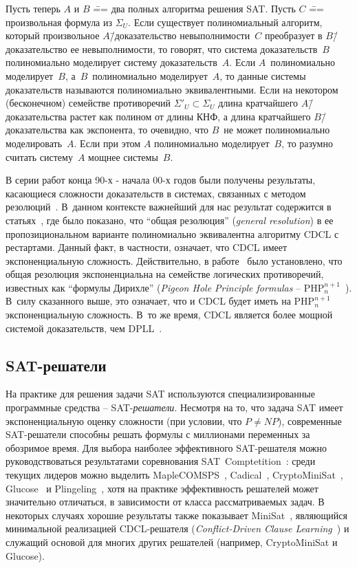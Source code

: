 Пусть теперь $A$ и $B$ \=== два полных алгоритма решения SAT.
Пусть $C$ \=== произвольная формула из $\Sigma_{U}$.
Если существует полиномиальный алгоритм, который произвольное $A$\=/доказательство невыполнимости~$C$ преобразует в $B$\=/доказательство ее невыполнимости, то говорят, что система доказательств~$B$ полиномиально моделирует систему доказательств~$A$.
Если $A$~полиномиально моделирует~$B$, а~$B$~полиномиально моделирует~$A$, то данные системы доказательств называются полиномиально эквивалентными.
Если на некотором (бесконечном) семействе противоречий ${\Sigma'}_{U} \subset \Sigma_{U}$ длина кратчайшего $A $\=/доказательства растет как полином от длины КНФ, а длина кратчайшего $B$\=/доказательства как экспонента, то очевидно, что $B$~не может полиномиально моделировать~$A$.
Если при этом $A$ полиномиально моделирует~$B$, то разумно считать систему~$A$ мощнее системы~$B$.

В серии работ конца 90-х \-- начала 00-х годов были получены результаты, касающиеся сложности доказательств в системах, связанных с методом резолюций~\cite{robinson1966}.
В~данном контексте важнейший для нас результат содержится в статьях~\cite{beame2003,beame2004}, где было показано, что \enquote{общая резолюция} (\textit{general resolution}) в ее пропозициональном варианте полиномиально эквивалентна алгоритму CDCL с рестартами.
Данный факт, в частности, означает, что CDCL имеет экспоненциальную сложность.
Действительно, в работе~\cite{haken1985} было установлено, что общая резолюция экспоненциальна на семействе логических противоречий, известных как \enquote{формулы Дирихле} (\textit{Pigeon Hole Principle formulas} \--- $\mathrm{PHP}_{n}^{n + 1}$~\cite{ben-sasson2004}).
В~силу сказанного выше, это означает, что и CDCL будет иметь на $\mathrm{PHP}_{n}^{n + 1}$ экспоненциальную сложность.
В~то же время, CDCL является более мощной системой доказательств, чем DPLL~\cite{beame2003,beame2004,ben-sasson2004}.


\subsection{SAT-решатели}
\label{sub:sat-solvers}

На практике для решения задачи SAT используются специализированные программные средства \--- SAT-\textit{решатели}.
Несмотря на то, что задача SAT имеет экспоненциальную оценку сложности (при условии, что $P \neq NP$), современные SAT-решатели способны решать формулы с миллионами переменных за обозримое время.
Для выбора наиболее эффективного SAT-решателя можно руководствоваться результатами соревнования SAT~Comptetition~\cite{sat-competition}: среди текущих лидеров можно выделить MapleCOMSPS~\cite{liang-2016}, Cadical~\cite{cadical}, CryptoMiniSat~\cite{cryptominisat}, Glucose~\cite{glucose} и Plingeling~\cite{lingeling-and-friends}, хотя на практике эффективность решателей может значительно отличаться, в зависимости от класса рассматриваемых задач.
В некоторых случаях хорошие результаты также показывает MiniSat~\cite{minisat}, являющийся минимальной реализацией CDCL-решателя (\textit{Conflict-Driven Clause Learning}~\cite{grasp}) и служащий основой для многих других решателей (например, CryptoMiniSat и Glucose).

